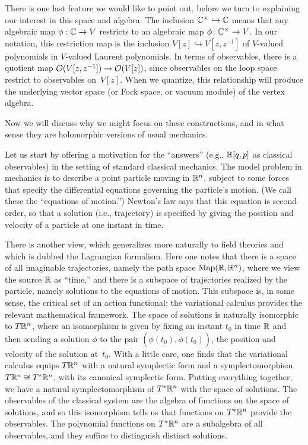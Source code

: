\documentclass[11pt]{amsart}
\begin{document}
There is one last feature we would like to point out, before we turn to explaining our interest in this space and algebra.
The inclusion $\mathbb C^\times \hookrightarrow \mathbb C$ means that any algebraic map  $\phi: \mathbb C \to V$ restricts to an algebraic map $\phi \colon \mathbb C^\times \to V$.
In our notation, this restriction map is the inclusion $V[z] \hookrightarrow V[z,z^{-1}]$ of $V$-valued polynomials in $V$-valued Laurent polynomials.
In terms of observables, there is a quotient map $\mathcal O(V[z,z^{-1}]) \to \mathcal O(V[z])$, since observables on the loop space restrict to observables on~$V[z]$.
When we quantize, this relationship will produce the underlying vector space (or Fock space, or vacuum module) of the vertex algebra.

Now we will discuss why we might focus on these constructions,
and in what sense they are holomorphic versions of usual mechanics.

Let us start by offering a motivation for the ``answers'' (e.g., $\mathbb R[q,p]$ as classical observables) in the setting of standard classical mechanics.
The model problem in mechanics is to describe a point particle moving in $\mathbb R^n$,
subject to some forces that specify the differential equations governing the particle's motion.
(We call these the ``equations of motion.'')
Newton's law says that this equation is second order, so that a solution (i.e., trajectory) is specified by giving the position and velocity of a particle at one instant in time.

There is another view, which generalizes more naturally to field theories and which is dubbed the Lagrangian formalism.
Here one notes that there is a space of all imaginable trajectories, namely the path space ${\rm Map}(\mathbb R, \mathbb R^n)$, where we view the source $\mathbb R$ as ``time,''
and there is a subspace of trajectories realized by the particle, namely solutions to the equations of motion.
This subspace is, in some sense, the critical set of an action functional; 
the variational calculus provides the relevant mathematical framework.
The space of solutions is naturally isomorphic to $T \mathbb R^n$,
where an isomorphism is given by fixing an instant $t_0$ in time $\mathbb R$ and then sending a solution $\phi$ to the pair $(\phi(t_0), \dot{\phi}(t_0))$, the position and velocity of the solution at~$t_0$.
With a little care, one finds that the variational calculus equips $T \mathbb R^n$ with a natural symplectic form and a symplectomorphism $T\mathbb R^n \cong T^* \mathbb R^n$, with its canonical symplectic form. 
Putting everything together, we have a natural symplectomorphism of $T^* \mathbb R^n$ with the space of solutions.
The observables of the classical system are the algebra of functions on the space of solutions,
and so this isomorphism tells us that functions on $T^* \mathbb R^n$ provide the observables.
The polynomial functions on $T^* \mathbb R^n$ are a subalgebra of all observables, 
and they suffice to distinguish distinct solutions.
\end{document}
